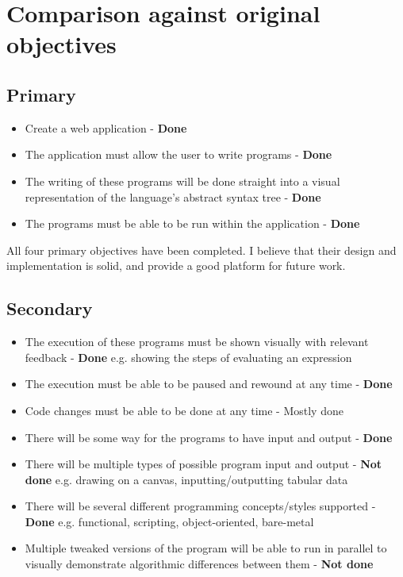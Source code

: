 \section{Comparison against original objectives}

\subsection{Primary}

\begin{itemize}
\item Create a web application - \textbf{Done}
\item The application must allow the user to write programs - \textbf{Done}
\item The writing of these programs will be done straight into a visual representation of the language's abstract syntax tree - \textbf{Done}
\item The programs must be able to be run within the application - \textbf{Done}
\end{itemize}

All four primary objectives have been completed. I believe that their design and implementation is solid, and provide a good platform for future work.

\subsection{Secondary}

\begin{itemize}
\item The execution of these programs must be shown visually with relevant feedback - \textbf{Done}
\subitem e.g. showing the steps of evaluating an expression
\item The execution must be able to be paused and rewound at any time - \textbf{Done}
\item Code changes must be able to be done at any time - Mostly done
\item There will be some way for the programs to have input and output - \textbf{Done}
\item There will be multiple types of possible program input and output - \textbf{Not done}
\subitem e.g. drawing on a canvas, inputting/outputting tabular data
\item There will be several different programming concepts/styles supported - \textbf{Done}
\subitem e.g. functional, scripting, object-oriented, bare-metal
\item Multiple tweaked versions of the program will be able to run in parallel to visually demonstrate algorithmic differences between them - \textbf{Not done}
\end{itemize}

